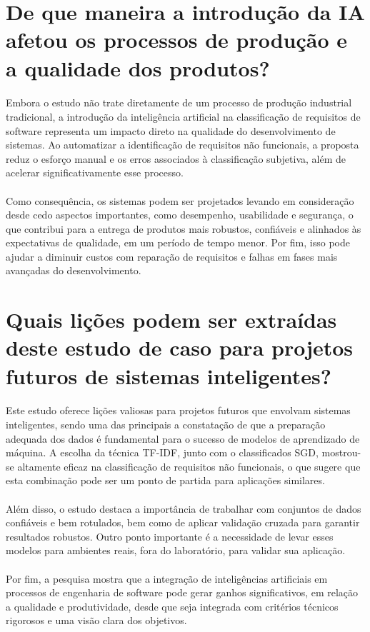 \documentclass{article}
\begin{document}
\section{De que maneira a introdução da IA afetou os processos de produção e a qualidade dos produtos?}

\paragraph{} Embora o estudo não trate diretamente de um processo de produção industrial tradicional, a introdução da inteligência artificial na classificação de requisitos de software representa um impacto direto na qualidade do desenvolvimento de sistemas. Ao automatizar a identificação de requisitos não funcionais, a proposta reduz o esforço manual e os erros associados à classificação subjetiva, além de acelerar significativamente esse processo.
\paragraph{} Como consequência, os sistemas podem ser projetados levando em consideração desde cedo aspectos importantes, como desempenho, usabilidade e segurança, o que contribui para a entrega de produtos mais robustos, confiáveis e alinhados às expectativas de qualidade, em um período de tempo menor. Por fim, isso pode ajudar a diminuir custos com reparação de requisitos e falhas em fases mais avançadas do desenvolvimento.

\section{Quais lições podem ser extraídas deste estudo de caso para projetos futuros de sistemas inteligentes?}

\paragraph{} Este estudo oferece lições valiosas para projetos futuros que envolvam sistemas inteligentes, sendo uma das principais a constatação de que a preparação adequada dos dados é fundamental para o sucesso de modelos de aprendizado de máquina. A escolha da técnica TF-IDF, junto com o classificados SGD, mostrou-se altamente eficaz na classificação de requisitos não funcionais, o que sugere que esta combinação pode ser um ponto de partida para aplicações similares. 
\paragraph{} Além disso, o estudo destaca a importância de trabalhar com conjuntos de dados confiáveis e bem rotulados, bem como de aplicar validação cruzada para garantir resultados robustos. Outro ponto importante é a necessidade de levar esses modelos para ambientes reais, fora do laboratório, para validar sua aplicação.
\paragraph{} Por fim, a pesquisa mostra que a integração de inteligências artificiais em processos de engenharia de software pode gerar ganhos significativos, em relação a qualidade e produtividade, desde que seja integrada com critérios técnicos rigorosos e uma visão clara dos objetivos.
\end{document}
